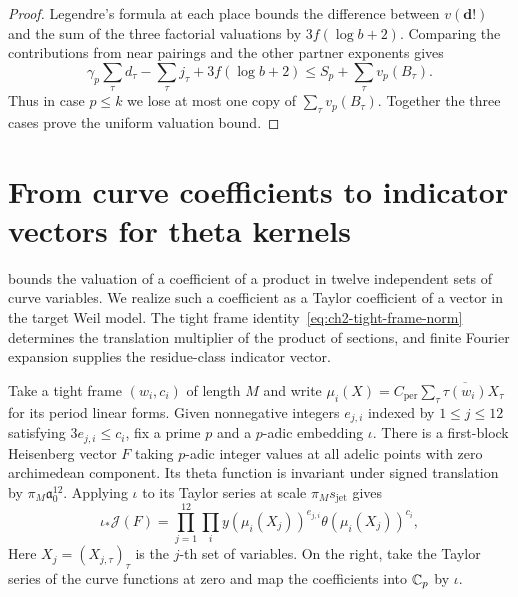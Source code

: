 \begin{proof}
Legendre's formula at each place bounds the difference between $v(\boldsymbol d!)$ and the sum of the three factorial valuations by $3f(\log b+2)$. Comparing the contributions from near pairings and the other partner exponents gives
\[
  \gamma_p\sum_\tau d_\tau-\sum_\tau j_\tau+3f(\log b+2)
      \le S_p+\sum_\tau v_p(B_\tau).
\]
Thus in case $p\le k$ we lose at most one copy of $\sum_\tau v_p(B_\tau)$. Together the three cases prove the uniform valuation bound.
\end{proof}

\section{From curve coefficients to indicator vectors for theta kernels}
\label{sec:ch2-realization}

 bounds the valuation of a coefficient of a product in twelve independent sets of curve variables. We realize such a coefficient as a Taylor coefficient of a vector in the target Weil model. The tight frame identity~\eqref{eq:ch2-tight-frame-norm} determines the translation multiplier of the product of sections, and finite Fourier expansion supplies the residue-class indicator vector.

\begin{lemma}
\label{lem:c-derivative-twelve-realization}
\emitthmsource
Take a tight frame $(w_i,c_i)$ of length $M$ and write $\mu_i(X)=C_{\mathrm{per}}\sum_\tau\overline{\tau(w_i)}X_\tau$ for its period linear forms. Given nonnegative integers $e_{j,i}$ indexed by $1\le j\le12$ satisfying $3e_{j,i}\le c_i$, fix a prime $p$ and a $p$-adic embedding $\iota$. There is a first-block Heisenberg vector $F$ taking $p$-adic integer values at all adelic points with zero archimedean component. Its theta function is invariant under signed translation by $\pi_M\mathfrak a_0^{12}$. Applying $\iota$ to its Taylor series at scale $\pi_M s_{\mathrm{jet}}$ gives
\[
 \iota_*\mathcal J(F)=
 \prod_{j=1}^{12}\prod_i
       y(\mu_i(X_j))^{e_{j,i}}\theta(\mu_i(X_j))^{c_i},
\]
Here $X_j=(X_{j,\tau})_\tau$ is the $j$-th set of variables. On the right, take the Taylor series of the curve functions at zero and map the coefficients into $\mathbb{C}_p$ by $\iota$.
\end{lemma}


